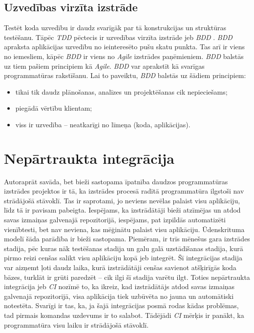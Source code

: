\subsection{Uzvedības virzīta izstrāde}
Testēt koda uzvedību ir daudz svarīgāk par tā konstrukcijas un struktūras testēšanu. Tāpēc \textit{TDD} pēctecis ir uzvedības virzīta izstrāde jeb \textit{BDD} . \textit{BDD} apraksta aplikācijas uzvedību no ieinteresēto pušu skatu punkta. Tas arī ir viens no iemesliem, kāpēc \textit{BDD} ir viens no \textit{Agile} izstrādes paņēmieniem. \textit{BDD} balstās uz tiem pašiem principiem kā \textit{Agile}.
\textit{BDD} var aprakstīt kā svarīgas programmatūras rakstīšanu. Lai to paveiktu, \textit{BDD} balstās uz šādiem principiem:
\begin{itemize}
	\item tikai tik daudz plānošanas, analīzes un projektēšanas cik nepieciešams;
	\item piegādā vērtību klientam;
	\item viss ir uzvedība -- neatkarīgi no līmeņa (koda, aplikācijas).
\end{itemize}
\cite[11. nodaļa]{chelimsky2010Rspec}


\section{Nepārtraukta integrācija}
Autoraprāt savāda, bet bieži sastopama īpatnība daudzos programmatūras izstrādes projektos ir tā, ka izstrādes procesā radītā programmatūra ilgstoši nav strādājošā stāvoklī. Tas ir saprotami, jo neviens nevēlas palaist visu aplikāciju, līdz tā ir pavisam pabeigta. Iespējams, ka izstrādātāji bieži atzīmējas un atdod savas izmaiņas galvenajā repozitorijā, iespējams, pat izpildās automatizēti vienībtesti, bet nav neviena, kas mēģinātu palaist visu aplikāciju. Ūdenskrituma modelī šāda parādība ir bieži sastopama. Piemēram, ir trīs mēnešus gara izstrādes stadija, pēc kuras nāk testēšanas stadija un galu galā uzstādīšanas stadija, kurā pirmo reizi cenšas salikt visu aplikāciju kopā jeb integrēt. Šī integrācijas stadija var aizņemt ļoti daudz laika, kurā izstrādātāji cenšas savienot atšķirīgās koda bāzes, turklāt ir grūti paredzēt -- cik ilgi šī stadija varētu ilgt.
Toties nepārtraukta integrācija jeb \textit{CI}  nozīmē to, ka ikreiz, kad izstrādātājs atdod savas izmaiņas galvenajā repozitorijā, visa aplikācija tiek uzbūvēta no jauna un automātiski notestēta. Svarīgi ir tas, ka, ja šajā integrācijas posmā rodas kādas problēmas, tad pirmais komandas uzdevums ir to salabot. Tādējādi \textit{CI} mērķis ir panākt, ka programmatūra visu laiku ir strādājošā stāvoklī.

